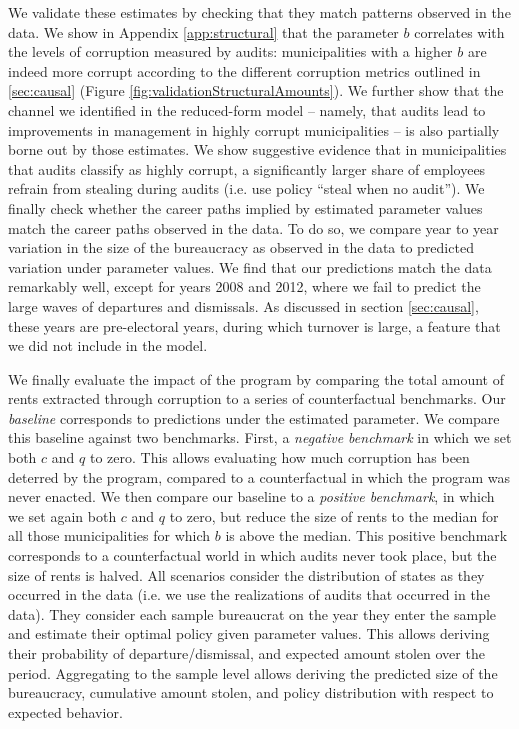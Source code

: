 \documentclass[12pt,a4paper]{article}
\theoremstyle{definition}
\begin{document}
{We validate these estimates by checking that they match patterns observed in the data. We show in Appendix \ref{app:structural} that the parameter $b$ correlates with the levels of corruption measured by audits: municipalities with a higher $b$ are indeed more corrupt according to the different corruption metrics outlined in \ref{sec:causal} (Figure \ref{fig:validationStructuralAmounts}). We further show that the channel we identified in the reduced-form model -- namely, that audits lead to improvements in management in highly corrupt municipalities -- is also partially borne out by those estimates. We show suggestive evidence that in municipalities that audits classify as highly corrupt, a significantly larger share of employees refrain from stealing during audits (i.e. use policy ``steal when no audit''). We finally check whether the career paths implied by estimated parameter values match the career paths observed in the data. To do so, we compare year to year variation in the size of the bureaucracy as observed in the data to predicted variation under parameter values. We find that our predictions match the data remarkably well, except for years 2008 and 2012, where we fail to predict the large waves of departures and dismissals. As discussed in section \ref{sec:causal}, these years are pre-electoral years, during which turnover is large, a feature that we did not include in the model.  

We finally evaluate the impact of the program by comparing the total amount of rents extracted through corruption to a series of counterfactual benchmarks. Our \emph{baseline} corresponds to predictions under the estimated parameter. We compare this baseline against two benchmarks. First, a \emph{negative benchmark} in which we set both $c$ and $q$ to zero. This allows evaluating how much corruption has been deterred by the program, compared to a counterfactual in which the program was never enacted. We then compare our baseline to a \emph{positive benchmark}, in which we set again both $c$ and $q$ to zero, but reduce the size of rents to the median for all those municipalities for which $b$ is above the median. This positive benchmark corresponds to a counterfactual world in which audits never took place, but the size of rents is halved. All scenarios consider the distribution of states as they occurred in the data (i.e. we use the realizations of audits that occurred in the data). They consider each sample bureaucrat on the year they enter the sample and estimate their optimal policy given parameter values. This allows deriving their probability of departure/dismissal, and expected amount stolen over the period. Aggregating to the sample level allows deriving the predicted size of the bureaucracy, cumulative amount stolen, and policy distribution with respect to expected behavior.

}
\end{document}
